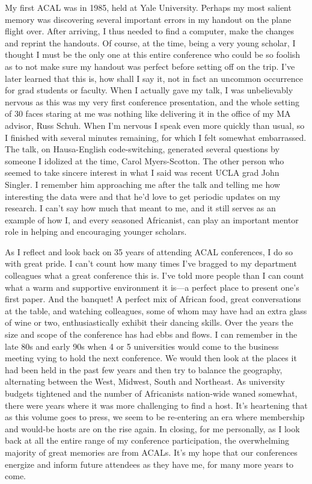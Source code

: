 \documentclass[output=paper]{langscibook}
\begin{document}
My first ACAL was in 1985, held at Yale University. Perhaps my most salient memory was discovering several important errors in my handout on the plane flight over. After arriving, I thus needed to find a computer, make the changes and reprint the handouts. Of course, at the time, being a very young scholar, I thought I must be the only one at this entire conference who could be so foolish as to not make sure my handout was perfect before setting off on the trip. I’ve later learned that this is, how shall I say it, not in fact an uncommon occurrence for grad students or faculty. When I actually gave my talk, I was unbelievably nervous as this was my very first conference presentation, and the whole setting of 30 faces staring at me was nothing like delivering it in the office of my MA advisor, Russ Schuh. When I’m nervous I speak even more quickly than usual, so I finished with several minutes remaining, for which I felt somewhat embarrassed. The talk, on Hausa-English code-switching, generated several questions by someone I idolized at the time, Carol Myers-Scotton. The other person who seemed to take sincere interest in what I said was recent UCLA grad John Singler. I remember him approaching me after the talk and telling me how interesting the data were and that he’d love to get periodic updates on my research. I can’t say how much that meant to me, and it still serves as an example of how I, and every seasoned Africanist, can play an important mentor role in helping and encouraging younger scholars.
 
As I reflect and look back on 35 years of attending ACAL conferences, I do so with great pride. I can’t count how many times I’ve bragged to my department colleagues what a great conference this is. I’ve told more people than I can count what a warm and supportive environment it is—a perfect place to present one’s first paper. And the banquet! A perfect mix of African food, great conversations at the table, and watching colleagues, some of whom may have had an extra glass of wine or two, enthusiastically exhibit their dancing skills. Over the years the size and scope of the conference has had ebbs and flows. I can remember in the late 80s and early 90s when 4 or 5 universities would come to the business meeting vying to hold the next conference. We would then look at the places it had been held in the past few years and then try to balance the geography, alternating between the West, Midwest, South and Northeast. As university budgets tightened and the number of Africanists nation-wide waned somewhat, there were years where it was more challenging to find a host. It’s heartening that as this volume goes to press, we seem to be re-entering an era where membership and would-be hosts are on the rise again. In closing, for me personally, as I look back at all the entire range of my conference participation, the overwhelming majority of great memories are from ACALs. It’s my hope that our conferences energize and inform future attendees as they have me, for many more years to come.
\end{document}
